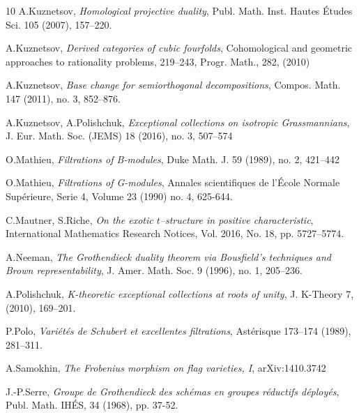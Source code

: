\documentclass[sn-mathphys-num]{sn-jnl}%
\theoremstyle{definition}
\begin{document}
\begin{thebibliography}{10}
A.Kuznetsov, {\it Homological projective duality}, Publ. Math. Inst. Hautes \'Etudes Sci. 105 (2007), 157--220.

A.Kuznetsov, {\it Derived categories of cubic fourfolds}, Cohomological and geometric approaches to rationality problems, 219--243, Progr. Math., 282, (2010)

A.Kuznetsov, {\it Base change for semiorthogonal decompositions},
Compos. Math. 147 (2011), no. 3, 852--876. 

A.Kuznetsov, A.Polishchuk, {\it Exceptional collections on isotropic Grassmannians}, J. Eur. Math. Soc. (JEMS) 18 (2016), no. 3, 507--574

O.Mathieu, {\it Filtrations of B-modules}, Duke Math. J. 59 (1989), no. 2, 421--442

O.Mathieu, {\it Filtrations of G-modules}, Annales scientifiques de l'\'Ecole Normale Sup\'erieure, Serie 4, Volume 23 (1990) no. 4, 625-644.

C.Mautner, S.Riche, {\it On the exotic $t$--structure in positive characteristic}, International Mathematics Research Notices, Vol. 2016, No. 18, pp. 5727--5774.

A.Neeman, {\it The Grothendieck duality theorem via Bousfield's techniques and Brown representability},  J. Amer. Math. Soc. 9 (1996), no. 1, 205--236.



A.Polishchuk, {\it K-theoretic exceptional collections at roots of 
unity}, J. K-Theory 7, (2010), 169--201.


P.Polo, {\it Vari\'et\'es de Schubert et excellentes filtrations}, Ast\'erisque 173--174 (1989), 281--311.

A.Samokhin, {\it The Frobenius morphism on flag varieties, I}, {arXiv:1410.3742}

J.-P.Serre, {\it Groupe de Grothendieck des sch\'emas en groupes r\'eductifs d\'eploy\'es},
Publ. Math. IH\'ES, 34 (1968), pp. 37-52.


\end{thebibliography}
\end{document}
